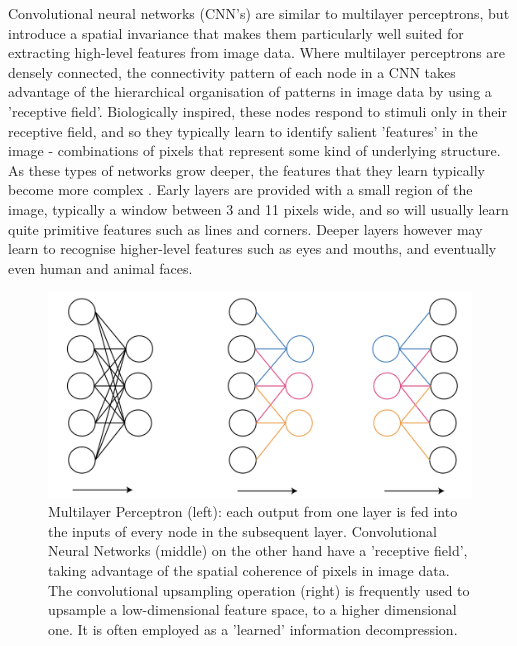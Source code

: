 \documentclass[openany]{book}
\begin{document}
Convolutional neural networks (CNN's) are similar to multilayer perceptrons, but introduce a spatial invariance that makes them particularly well suited for extracting high-level features from image data. Where multilayer perceptrons are densely connected, the connectivity pattern of each node in a CNN takes advantage of the hierarchical organisation of patterns in image data by using a 'receptive field'. Biologically inspired, these nodes respond to stimuli only in their receptive field, and so they typically learn to identify salient 'features' in the image - combinations of pixels that represent some kind of underlying structure. As these types of networks grow deeper, the features that they learn typically become more complex \cite{lecun1989cnn}. Early layers are provided with a small region of the image, typically a window between 3 and 11 pixels wide, and so will usually learn quite primitive features such as lines and corners. Deeper layers however may learn to recognise higher-level features such as eyes and mouths, and eventually even human and animal faces.

\begin{figure}[tbp]
    \centering
    \includegraphics[width=5in]{images/cnnvsmlp.png}
    
    \caption{Multilayer Perceptron (left): each output from one layer is fed into the inputs of every node in the subsequent layer. Convolutional Neural Networks (middle) on the other hand have a 'receptive field', taking advantage of the spatial coherence of pixels in image data. The convolutional upsampling operation (right) is frequently used to upsample a low-dimensional feature space, to a higher dimensional one. It is often employed as a 'learned' information decompression.}
    
    \label{convexhull}
\end{figure}
\end{document}
